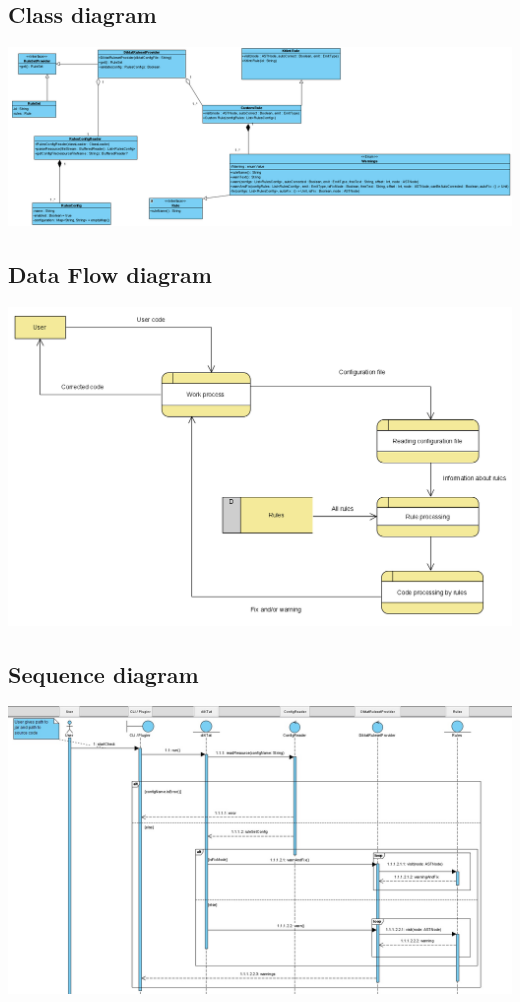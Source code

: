 \subsection{Class diagram}
  \includegraphics[scale=0.5]{pictures/class.PNG}

\subsection{Data Flow diagram}
  \includegraphics[scale=0.6]{pictures/data_flow.PNG}

\subsection{Sequence diagram}
  \includegraphics[scale=0.33]{pictures/sequence.jpg}